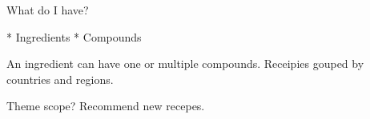 What do I have?

	* Ingredients
	* Compounds

	An ingredient can have one or multiple compounds.
	Receipies gouped by countries and regions.

Theme scope?
	Recommend new recepes.